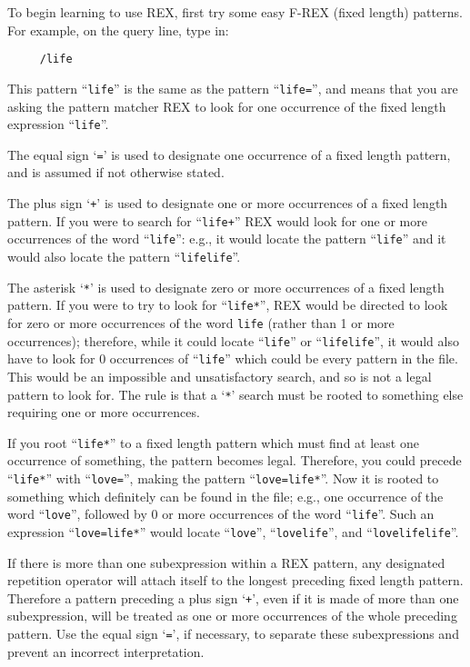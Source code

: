 To begin learning to use REX, first try some easy F-REX (fixed length)
patterns.  For example, on the query line, type in:

\begin{verbatim}
     /life
\end{verbatim}

This pattern ``\verb`life`'' is the same as the pattern
``\verb`life=`'', and means that you are asking the pattern matcher
REX to look for one occurrence of the fixed length expression
``\verb`life`''.

The equal sign `\verb`=`' is used to designate one occurrence of a
fixed length pattern, and is assumed if not otherwise stated.

The plus sign `\verb`+`' is used to designate one or more occurrences
of a fixed length pattern.  If you were to search for ``\verb`life+`''
REX would look for one or more occurrences of the word
``\verb`life`'':  e.g., it would locate the pattern ``\verb`life`''
and it would also locate the pattern ``\verb`lifelife`''.

The asterisk `\verb`*`' is used to designate zero or more occurrences
of a fixed length pattern.  If you were to try to look for
``\verb`life*`'', REX would be directed to look for zero or more
occurrences of the word \verb`life` (rather than 1 or more
occurrences); therefore, while it could locate ``\verb`life`'' or
``\verb`lifelife`'', it would also have to look for 0 occurrences of
``\verb`life`'' which could be every pattern in the file.  This would
be an impossible and unsatisfactory search, and so is not a legal
pattern to look for.  The rule is that a `\verb`*`' search must be
rooted to something else requiring one or more occurrences.

If you root ``\verb`life*`'' to a fixed length pattern which must find
at least one occurrence of something, the pattern becomes legal.
Therefore, you could precede ``\verb`life*`'' with ``\verb`love=`'',
making the pattern ``\verb`love=life*`''.  Now it is rooted to
something which definitely can be found in the file; e.g., one
occurrence of the word ``\verb`love`'', followed by 0 or more
occurrences of the word ``\verb`life`''.  Such an expression
``\verb`love=life*`'' would locate ``\verb`love`'',
``\verb`lovelife`'', and ``\verb`lovelifelife`''.

If there is more than one subexpression within a REX pattern, any
designated repetition operator will attach itself to the longest
preceding fixed length pattern.  Therefore a pattern preceding a plus
sign `\verb`+`', even if it is made of more than one subexpression,
will be treated as one or more occurrences of the whole preceding
pattern.  Use the equal sign `\verb`=`', if necessary, to separate
these subexpressions and prevent an incorrect interpretation.

